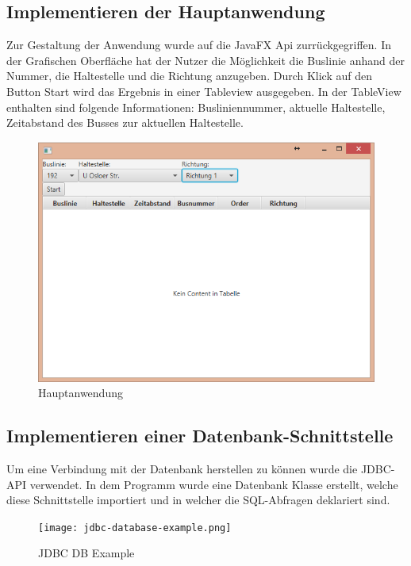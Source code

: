 \documentclass[a4paper, 12.5pt]{scrartcl}
\begin{document}
\subsection{Implementieren der Hauptanwendung}
Zur Gestaltung der Anwendung wurde auf die JavaFX Api zurrückgegriffen. 
In der Grafischen Oberfläche hat der Nutzer die Möglichkeit die Buslinie anhand der Nummer, 
die Haltestelle und die Richtung anzugeben. Durch Klick auf den Button Start wird das Ergebnis in einer Tableview ausgegeben. In der TableView enthalten sind folgende Informationen:
Busliniennummer, aktuelle Haltestelle, Zeitabstand des Busses zur aktuellen Haltestelle.\\

\begin{figure}[h]
	\centering
	\includegraphics[scale=0.6]{Hauptanwendung.png}
	\caption{Hauptanwendung}
	\label{img:Hauptanwendung}
\end{figure}
\newpage

\subsection{Implementieren einer Datenbank-Schnittstelle}
Um eine Verbindung mit der Datenbank herstellen zu können wurde die JDBC-API verwendet. In dem Programm wurde eine Datenbank Klasse erstellt, welche diese Schnittstelle importiert und in welcher die SQL-Abfragen deklariert sind.\\

\begin{figure}[h]
	\centering
	\texttt{[image: jdbc-database-example.png]}
	\caption{JDBC DB Example}
	\label{img:JDBC}
\end{figure}
\end{document}
